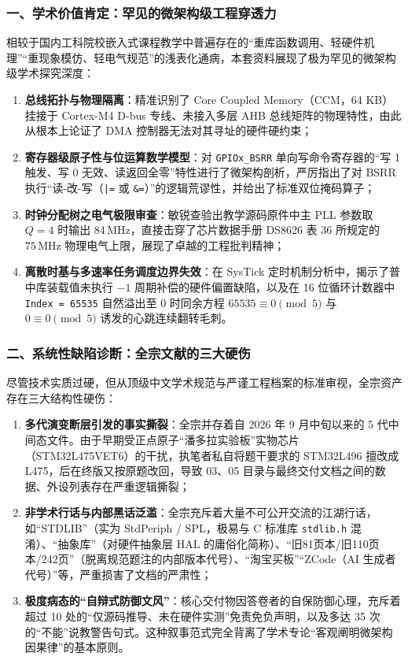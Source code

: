 \documentclass[11pt,a4paper]{ctexart}
\begin{document}
\subsubsection*{一、学术价值肯定：罕见的微架构级工程穿透力}
相较于国内工科院校嵌入式课程教学中普遍存在的“重库函数调用、轻硬件机理”“重现象模仿、轻电气规范”的浅表化通病，本套资料展现了极为罕见的微架构级学术探究深度：
\begin{enumerate}[label=\textbf{\arabic*.}]
  \item \textbf{总线拓扑与物理隔离}：精准识别了 Core Coupled Memory（CCM，64 KB）挂接于 Cortex-M4 D-bus 专线、未接入多层 AHB 总线矩阵的物理特性，由此从根本上论证了 DMA 控制器无法对其寻址的硬件硬约束；
  \item \textbf{寄存器级原子性与位运算数学模型}：对 \texttt{GPIOx\_BSRR} 单向写命令寄存器的“写 1 触发、写 0 无效、读返回全零”特性进行了微架构剖析，严厉指出了对 BSRR 执行“读-改-写（\texttt{|=} 或 \texttt{\&=}）”的逻辑荒谬性，并给出了标准双位掩码算子；
  \item \textbf{时钟分配树之电气极限审查}：敏锐查验出教学源码原件中主 PLL 参数取 $Q=4$ 时输出 $84\,\mathrm{MHz}$，直接击穿了芯片数据手册 DS8626 表 36 所规定的 $75\,\mathrm{MHz}$ 物理电气上限，展现了卓越的工程批判精神；
  \item \textbf{离散时基与多速率任务调度边界失效}：在 SysTick 定时机制分析中，揭示了普中库装载值未执行 $-1$ 周期补偿的硬件偏置缺陷，以及在 16 位循环计数器中 \texttt{Index = 65535} 自然溢出至 0 时同余方程 $65535 \equiv 0 \pmod 5$ 与 $0 \equiv 0 \pmod 5$ 诱发的心跳连续翻转毛刺。
\end{enumerate}

\subsubsection*{二、系统性缺陷诊断：全宗文献的三大硬伤}
尽管技术实质过硬，但从顶级中文学术规范与严谨工程档案的标准审视，全宗资产存在三大结构性硬伤：
\begin{enumerate}[label=\textbf{\arabic*.}]
  \item \textbf{多代演变断层引发的事实撕裂}：全宗并存着自 2026 年 9 月中旬以来的 5 代中间态文件。由于早期受正点原子“潘多拉实验板”实物芯片（STM32L475VET6）的干扰，执笔者私自将题干要求的 STM32L496 擅改成 L475，后在终版又按原题改回，导致 03、05 目录与最终交付文档之间的数据、外设列表存在严重逻辑撕裂；
  \item \textbf{非学术行话与内部黑话泛滥}：全宗充斥着大量不可公开交流的江湖行话，如“STDLIB”（实为 StdPeriph / SPL，极易与 C 标准库 \texttt{stdlib.h} 混淆）、“抽象库”（对硬件抽象层 HAL 的庸俗化简称）、“旧81页本/旧110页本/242页”（脱离规范题注的内部版本代号）、“淘宝买板”“ZCode（AI 生成者代号）”等，严重损害了文档的严肃性；
  \item \textbf{极度病态的“自辩式防御文风”}：核心交付物因答卷者的自保防御心理，充斥着超过 10 处的“仅源码推导、未在硬件实测”免责免负声明，以及多达 35 次的“不能”说教警告句式。这种叙事范式完全背离了学术专论“客观阐明微架构因果律”的基本原则。
\end{enumerate}
\end{document}
